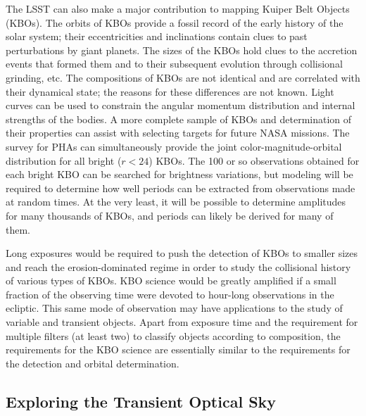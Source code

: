 The LSST can also make a major contribution to mapping Kuiper Belt Objects
(KBOs).  The orbits of KBOs provide a fossil record of the early history of
the solar system; their eccentricities and inclinations contain clues to
past perturbations by giant planets. The sizes of the KBOs hold clues to
the accretion events that formed them and to their subsequent evolution
through collisional grinding, etc. The compositions of KBOs are not
identical and are correlated with their dynamical state; the reasons for
these differences are not known. Light curves can be used to constrain the
angular momentum distribution and internal strengths of the bodies. A more
complete sample of KBOs and determination of their properties can assist
with selecting targets for future NASA missions. The survey for PHAs can
simultaneously provide the joint color-magnitude-orbital distribution for
all bright ($r<24$) KBOs. The 100 or so observations obtained for each
bright KBO can be searched for brightness variations, but modeling will be
required to determine how well periods can be extracted from observations
made at random times. At the very least, it will be possible to determine
amplitudes for many thousands of KBOs, and periods can likely be derived
for many of them.

Long exposures would be required to push the detection of KBOs to smaller
sizes and reach the erosion-dominated regime in order to study the
collisional history of various types of KBOs. KBO science would be greatly
amplified if a small fraction of the observing time were devoted to
hour-long observations in the ecliptic. This same mode of observation may
have applications to the study of variable and transient objects. Apart
from exposure time and the requirement for multiple filters (at least two)
to classify objects according to composition, the requirements for the KBO
science are essentially similar to the requirements for the detection and
orbital determination.



\subsection{Exploring the Transient Optical Sky}


